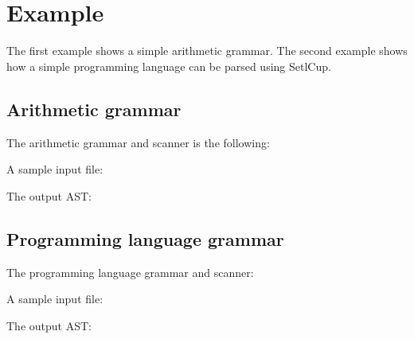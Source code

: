 \section{Example}
The first example shows a simple arithmetic grammar.
The second example shows how a simple programming language can be parsed using SetlCup.
\subsection{Arithmetic grammar}
The arithmetic grammar and scanner is the following:

A sample input file:

The output AST:

\subsection{Programming language grammar}
The programming language grammar and scanner:

A sample input file:

The output AST:

